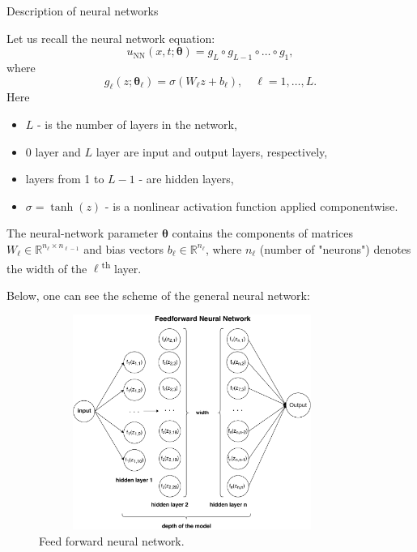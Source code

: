 \documentclass{beamer}
\def\\{}%
\renewcommand{\vec}[1]{\boldsymbol{#1}}
\newcommand{\VTheta}{\ensuremath{\vec{\theta}}}
\newcommand{\R}{\mathbb R}
\newcommand{\UNN}[1][\text{NN}]{u_{#1}}
\begin{document}
\begin{frame}{Description of neural networks}
    
Let us recall the neural network equation:
$$
\UNN(x, t; \vec{\theta}) = g_L \circ g_{L-1} \circ \dots \circ g_1,
$$
where
\[
    g_\ell(z; \VTheta_\ell) = \sigma (W_\ell z + b_\ell), \quad \ell = 1,\dots,L.
\]
Here 
\begin{itemize}
    \item $L$  - is the number of layers in the network,
    \item 0 layer and $L$ layer are input and output layers, respectively,
    \item layers from 1 to $L-1$ - are hidden layers,
    \item $\sigma = \tanh (z) $ - is a nonlinear activation function applied componentwise.
\end{itemize} 
 
The neural-network parameter $\VTheta$ contains the components of matrices
$W_\ell \in \R^{n_{\ell}\times n_{\ell-1}}$ and bias vectors
$b_\ell \in \R^{n_\ell}$, where $n_\ell$  (number of "neurons") denotes the width of the
$\ell$\textsuperscript{th} layer.
    
\end{frame}

\begin{frame}

Below, one can see the scheme of the general neural network:
\begin{figure}
\centering
\includegraphics[width = 10cm , height = 7cm]{images/FFNN.pdf}
\\
\caption{Feed forward neural network.}
\end{figure}
\end{frame}
\end{document}
